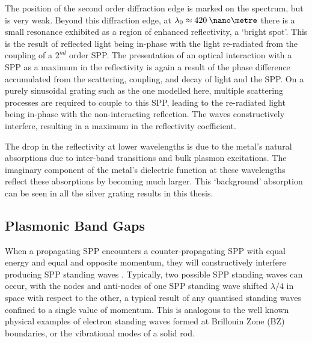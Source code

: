 The position of the second order diffraction edge is marked on the spectrum, but is very weak. Beyond this diffraction edge, at $\lambda_0\approx 420\:\nano\metre$ there is a small resonance exhibited as a region of enhanced reflectivity, a `bright spot'. This is the result of reflected light being in-phase with the light re-radiated from the coupling of a $2^{nd}$ order SPP. The presentation of an optical interaction with a SPP as a maximum in the reflectivity is again a result of the phase difference accumulated from the scattering, coupling, and decay of light and the SPP. On a purely sinusoidal grating such as the one modelled here, multiple scattering processes are required to couple to this SPP, leading to the re-radiated light being in-phase with the non-interacting reflection. The waves constructively interfere, resulting in a maximum in the reflectivity coefficient.

The drop in the reflectivity at lower wavelengths is due to the metal's natural absorptions due to inter-band transitions and bulk plasmon excitations. The imaginary component of the metal's dielectric function at these wavelengths reflect these absorptions by becoming much larger. This `background' absorption can be seen in all the silver grating results in this thesis.



\subsection{Plasmonic Band Gaps}
When a propagating SPP encounters a counter-propagating SPP with equal energy and equal and opposite momentum, they will constructively interfere producing SPP standing waves \cite{Barnes1995,Barnes1996}. Typically, two possible SPP standing waves can occur, with the nodes and anti-nodes of one SPP standing wave shifted $\lambda/4$ in space with respect to the other, a typical result of any quantised standing waves confined to a single value of momentum. This is analogous to the well known physical examples of electron standing waves formed at Brillouin Zone (BZ) boundaries, or the vibrational modes of a solid rod.

